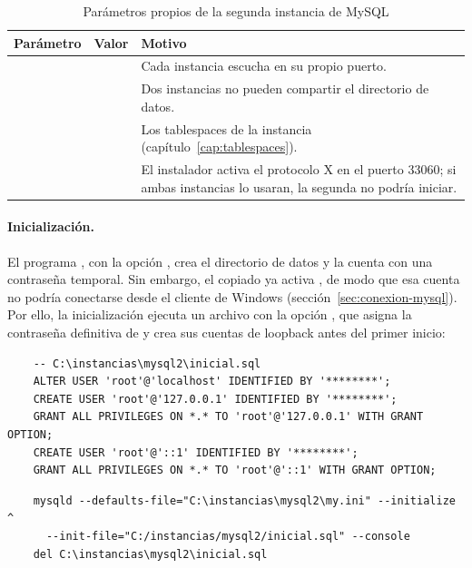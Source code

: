 \begin{table}[H]
	\centering
	\small
	\caption{Parámetros propios de la segunda instancia de MySQL}
	\label{tab:mysql2-parametros}
	\begin{tabular}{@{}L{3.4cm} L{5.2cm} L{7.2cm}@{}}
		\toprule
		\textbf{Parámetro} & \textbf{Valor} & \textbf{Motivo} \\
		\midrule
		 &  & Cada instancia escucha en su propio puerto. \\
		 &  & Dos instancias no pueden compartir el directorio de datos. \\
		 &  & Los tablespaces de la instancia (capítulo~\ref{cap:tablespaces}). \\
		 &  & El instalador activa el protocolo X en el puerto 33060; si ambas instancias lo usaran, la segunda no podría iniciar. \\
		\bottomrule
	\end{tabular}
\end{table}

\paragraph{Inicialización.} El programa , con la opción , crea el directorio de datos y la cuenta  con una contraseña temporal. Sin embargo, el  copiado ya activa , de modo que esa cuenta no podría conectarse desde el cliente de Windows (sección~\ref{sec:conexion-mysql}). Por ello, la inicialización ejecuta un archivo con la opción , que asigna la contraseña definitiva de  y crea sus cuentas de loopback antes del primer inicio:

\begin{verbatim}
	-- C:\instancias\mysql2\inicial.sql
	ALTER USER 'root'@'localhost' IDENTIFIED BY '********';
	CREATE USER 'root'@'127.0.0.1' IDENTIFIED BY '********';
	GRANT ALL PRIVILEGES ON *.* TO 'root'@'127.0.0.1' WITH GRANT OPTION;
	CREATE USER 'root'@'::1' IDENTIFIED BY '********';
	GRANT ALL PRIVILEGES ON *.* TO 'root'@'::1' WITH GRANT OPTION;
\end{verbatim}

\begin{verbatim}
	mysqld --defaults-file="C:\instancias\mysql2\my.ini" --initialize ^
	  --init-file="C:/instancias/mysql2/inicial.sql" --console
	del C:\instancias\mysql2\inicial.sql
\end{verbatim}

